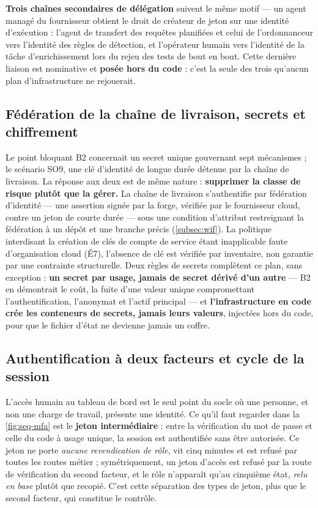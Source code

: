 \textbf{Trois chaînes secondaires de délégation} suivent le même motif --- un agent managé du
fournisseur obtient le droit de créateur de jeton sur une identité d'exécution : l'agent de
transfert des requêtes planifiées et celui de l'ordonnanceur vers l'identité des règles de
détection, et l'opérateur humain vers l'identité de la tâche d'enrichissement lors du rejeu des
tests de bout en bout. Cette dernière liaison est nominative et \textbf{posée hors du code} :
c'est la seule des trois qu'aucun plan d'infrastructure ne rejouerait.

\subsection{Fédération de la chaîne de livraison, secrets et chiffrement}

Le point bloquant B2 concernait un secret unique gouvernant sept mécanismes ; le scénario SO9, une
clé d'identité de longue durée détenue par la chaîne de livraison. La réponse aux deux est de même
nature : \textbf{supprimer la classe de risque plutôt que la gérer.} La chaîne de livraison
s'authentifie par fédération d'identité --- une assertion signée par la forge, vérifiée par le
fournisseur cloud, contre un jeton de courte durée --- sous une condition d'attribut restreignant la
fédération à un dépôt et une branche précis (\cref{subsec:wif}). La politique interdisant la
création de clés de compte de service étant inapplicable faute d'organisation cloud (É7), l'absence
de clé est vérifiée par inventaire, non garantie par une contrainte structurelle. Deux règles de
secrets complètent ce plan, sans exception : \textbf{un secret par usage, jamais de secret dérivé
d'un autre} --- B2 en démontrait le coût, la fuite d'une valeur unique compromettant
l'authentification, l'anonymat et l'actif principal --- et \textbf{l'infrastructure en code crée les
conteneurs de secrets, jamais leurs valeurs}, injectées hors du code, pour que le fichier d'état ne
devienne jamais un coffre.

\subsection{Authentification à deux facteurs et cycle de la session}

L'accès humain au tableau de bord est le seul point du socle où une personne, et non une charge de
travail, présente une identité. Ce qu'il faut regarder dans la \cref{fig:seq-mfa} est le
\textbf{jeton intermédiaire} : entre la vérification du mot de passe et celle du code à usage
unique, la session est authentifiée sans être autorisée. Ce jeton ne porte \emph{aucune revendication
de rôle}, vit cinq minutes et est refusé par toutes les routes métier ; symétriquement, un jeton
d'accès est refusé par la route de vérification du second facteur, et le rôle n'apparaît qu'au
cinquième état, \emph{relu en base} plutôt que recopié. C'est cette séparation des types de jeton,
plus que le second facteur, qui constitue le contrôle.


